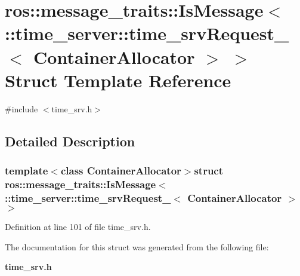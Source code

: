 \section{ros\-:\-:message\-\_\-traits\-:\-:\-Is\-Message$<$ \-:\-:time\-\_\-server\-:\-:time\-\_\-srv\-Request\-\_\-$<$ \-Container\-Allocator $>$ $>$ \-Struct \-Template \-Reference}
\label{structros_1_1message__traits_1_1IsMessage_3_01_1_1time__server_1_1time__srvRequest___3_01ContainerAllocator_01_4_01_4}


{\ttfamily \#include $<$time\-\_\-srv.\-h$>$}



\subsection{\-Detailed \-Description}
\subsubsection*{template$<$class Container\-Allocator$>$struct ros\-::message\-\_\-traits\-::\-Is\-Message$<$ \-::time\-\_\-server\-::time\-\_\-srv\-Request\-\_\-$<$ Container\-Allocator $>$ $>$}



\-Definition at line 101 of file time\-\_\-srv.\-h.



\-The documentation for this struct was generated from the following file\-:\begin{DoxyCompactItemize}
\item 
{\bf time\-\_\-srv.\-h}\end{DoxyCompactItemize}

